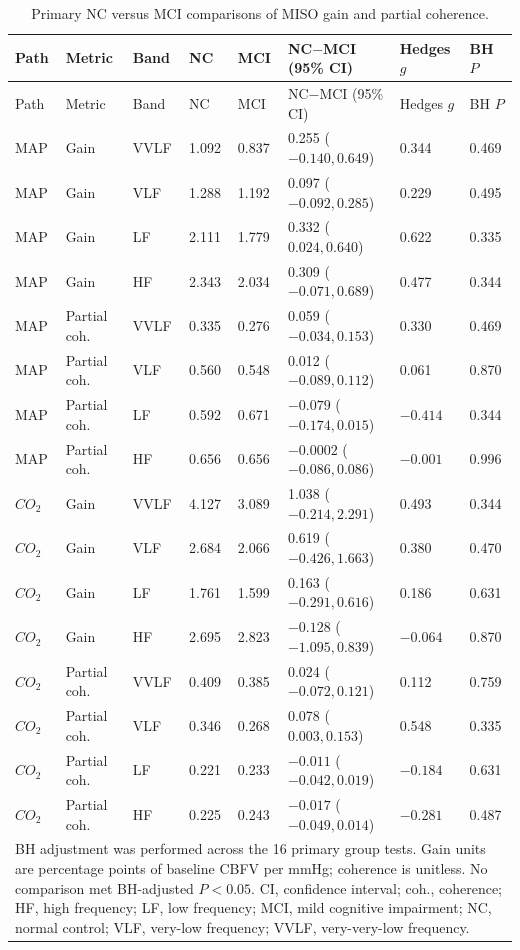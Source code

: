 \documentclass[12pt]{article}
\newcommand{\COtwo}{CO_2}
\begin{document}
\begin{landscape}
\scriptsize
\begin{longtable}{p{0.48in}p{0.60in}p{0.45in}p{0.62in}p{0.62in}p{1.20in}p{0.54in}p{0.58in}}
\caption{Primary NC versus MCI comparisons of MISO gain and partial coherence.}
\label{tab:group_primary}\\
\toprule
Path & Metric & Band & NC & MCI & NC$-$MCI (95\% CI) & Hedges $g$ & BH $P$ \\
\midrule
\endfirsthead
\toprule
Path & Metric & Band & NC & MCI & NC$-$MCI (95\% CI) & Hedges $g$ & BH $P$ \\
\midrule
\endhead
MAP & Gain & VVLF & 1.092 & 0.837 & 0.255 ($-0.140,0.649$) & 0.344 & 0.469 \\
MAP & Gain & VLF  & 1.288 & 1.192 & 0.097 ($-0.092,0.285$) & 0.229 & 0.495 \\
MAP & Gain & LF   & 2.111 & 1.779 & 0.332 ($0.024,0.640$) & 0.622 & 0.335 \\
MAP & Gain & HF   & 2.343 & 2.034 & 0.309 ($-0.071,0.689$) & 0.477 & 0.344 \\
MAP & Partial coh. & VVLF & 0.335 & 0.276 & 0.059 ($-0.034,0.153$) & 0.330 & 0.469 \\
MAP & Partial coh. & VLF  & 0.560 & 0.548 & 0.012 ($-0.089,0.112$) & 0.061 & 0.870 \\
MAP & Partial coh. & LF   & 0.592 & 0.671 & $-0.079$ ($-0.174,0.015$) & $-0.414$ & 0.344 \\
MAP & Partial coh. & HF   & 0.656 & 0.656 & $-0.0002$ ($-0.086,0.086$) & $-0.001$ & 0.996 \\
\addlinespace
$\COtwo$ & Gain & VVLF & 4.127 & 3.089 & 1.038 ($-0.214,2.291$) & 0.493 & 0.344 \\
$\COtwo$ & Gain & VLF  & 2.684 & 2.066 & 0.619 ($-0.426,1.663$) & 0.380 & 0.470 \\
$\COtwo$ & Gain & LF   & 1.761 & 1.599 & 0.163 ($-0.291,0.616$) & 0.186 & 0.631 \\
$\COtwo$ & Gain & HF   & 2.695 & 2.823 & $-0.128$ ($-1.095,0.839$) & $-0.064$ & 0.870 \\
$\COtwo$ & Partial coh. & VVLF & 0.409 & 0.385 & 0.024 ($-0.072,0.121$) & 0.112 & 0.759 \\
$\COtwo$ & Partial coh. & VLF  & 0.346 & 0.268 & 0.078 ($0.003,0.153$) & 0.548 & 0.335 \\
$\COtwo$ & Partial coh. & LF   & 0.221 & 0.233 & $-0.011$ ($-0.042,0.019$) & $-0.184$ & 0.631 \\
$\COtwo$ & Partial coh. & HF   & 0.225 & 0.243 & $-0.017$ ($-0.049,0.014$) & $-0.281$ & 0.487 \\
\bottomrule
\multicolumn{8}{p{8.2in}}{\footnotesize BH adjustment was performed across
the 16 primary group tests. Gain units are percentage points of baseline CBFV
per mmHg; coherence is unitless. No comparison met BH-adjusted $P<0.05$. CI,
confidence interval; coh., coherence; HF, high frequency; LF, low frequency;
MCI, mild cognitive impairment; NC, normal control; VLF, very-low frequency;
VVLF, very-very-low frequency.}\\
\end{longtable}
\end{landscape}
\end{document}
